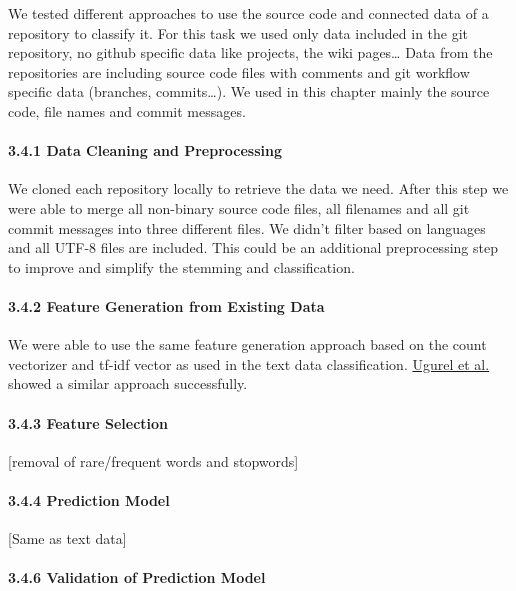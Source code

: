 \documentclass{article}
\begin{document}
We tested different approaches to use the source code and connected data
of a repository to classify it. For this task we used only data included
in the git repository, no github specific data like projects, the wiki
pages\ldots{} Data from the repositories are including source code files
with comments and git workflow specific data (branches,
commits\ldots{}). We used in this chapter mainly the source code, file
names and commit messages.

\paragraph{3.4.1 Data Cleaning and
Preprocessing}\label{data-cleaning-and-preprocessing-2}

We cloned each repository locally to retrieve the data we need. After
this step we were able to merge all non-binary source code files, all
filenames and all git commit messages into three different files. We
didn't filter based on languages and all UTF-8 files are included. This
could be an additional preprocessing step to improve and simplify the
stemming and classification.

\paragraph{3.4.2 Feature Generation from Existing
Data}\label{feature-generation-from-existing-data-1}

We were able to use the same feature generation approach based on the
count vectorizer and tf-idf vector as used in the text data
classification.
\href{https://clgiles.ist.psu.edu/papers/KDD-2002-whatsthecode.pdf}{Ugurel
et al.} showed a similar approach successfully.

\paragraph{3.4.3 Feature Selection}\label{feature-selection-2}

{[}removal of rare/frequent words and stopwords{]}

\paragraph{3.4.4 Prediction Model}\label{prediction-model-2}

{[}Same as text data{]}

\paragraph{3.4.6 Validation of Prediction
Model}\label{validation-of-prediction-model-2}
\end{document}
